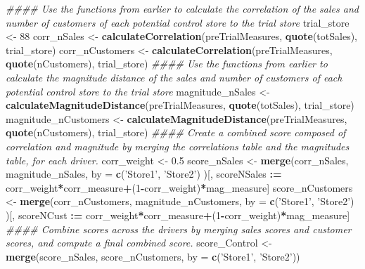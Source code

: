 \documentclass[]{article}
\newenvironment{Shaded}{\begin{snugshade}}{\end{snugshade}}
\newcommand{\CommentTok}[1]{\textcolor[rgb]{0.56,0.35,0.01}{\textit{#1}}}
\newcommand{\DataTypeTok}[1]{\textcolor[rgb]{0.13,0.29,0.53}{#1}}
\newcommand{\DecValTok}[1]{\textcolor[rgb]{0.00,0.00,0.81}{#1}}
\newcommand{\ErrorTok}[1]{\textcolor[rgb]{0.64,0.00,0.00}{\textbf{#1}}}
\newcommand{\FloatTok}[1]{\textcolor[rgb]{0.00,0.00,0.81}{#1}}
\newcommand{\KeywordTok}[1]{\textcolor[rgb]{0.13,0.29,0.53}{\textbf{#1}}}
\newcommand{\NormalTok}[1]{#1}
\newcommand{\OperatorTok}[1]{\textcolor[rgb]{0.81,0.36,0.00}{\textbf{#1}}}
\newcommand{\StringTok}[1]{\textcolor[rgb]{0.31,0.60,0.02}{#1}}
\begin{document}
\begin{Shaded}
\begin{Highlighting}[]
{\CommentTok{#### Use the functions from earlier to calculate the correlation of the sales and number of customers of each potential control store to the trial store}
\NormalTok{trial_store <-}\StringTok{ }\DecValTok{88}
\NormalTok{corr_nSales <-}\StringTok{ }\KeywordTok{calculateCorrelation}\NormalTok{(preTrialMeasures, }\KeywordTok{quote}\NormalTok{(totSales), trial_store)}
\NormalTok{corr_nCustomers <-}\StringTok{ }\KeywordTok{calculateCorrelation}\NormalTok{(preTrialMeasures, }\KeywordTok{quote}\NormalTok{(nCustomers), trial_store)}
\CommentTok{#### Use the functions from earlier to calculate the magnitude distance of the sales and number of customers of each potential control store to the trial store}
\NormalTok{magnitude_nSales <-}\StringTok{ }\KeywordTok{calculateMagnitudeDistance}\NormalTok{(preTrialMeasures, }\KeywordTok{quote}\NormalTok{(totSales), trial_store)}
\NormalTok{magnitude_nCustomers <-}\StringTok{ }\KeywordTok{calculateMagnitudeDistance}\NormalTok{(preTrialMeasures, }\KeywordTok{quote}\NormalTok{(nCustomers), trial_store)}
\CommentTok{#### Create a combined score composed of correlation and magnitude by merging the correlations table and the magnitudes table, for each driver.}
\NormalTok{corr_weight <-}\StringTok{ }\FloatTok{0.5}
\NormalTok{score_nSales <-}\StringTok{ }\KeywordTok{merge}\NormalTok{(corr_nSales, magnitude_nSales,}
                      \DataTypeTok{by =} \KeywordTok{c}\NormalTok{(}\StringTok{'Store1'}\NormalTok{, }\StringTok{'Store2'}\NormalTok{)}
\NormalTok{                      )[, scoreNSales }\OperatorTok{:}\ErrorTok{=}\StringTok{ }\NormalTok{corr_weight}\OperatorTok{*}\NormalTok{corr_measure}\OperatorTok{+}\NormalTok{(}\DecValTok{1}\OperatorTok{-}\NormalTok{corr_weight)}\OperatorTok{*}\NormalTok{mag_measure]}
\NormalTok{score_nCustomers <-}\StringTok{ }\KeywordTok{merge}\NormalTok{(corr_nCustomers, magnitude_nCustomers,}
                      \DataTypeTok{by =} \KeywordTok{c}\NormalTok{(}\StringTok{'Store1'}\NormalTok{, }\StringTok{'Store2'}\NormalTok{)}
\NormalTok{                      )[, scoreNCust }\OperatorTok{:}\ErrorTok{=}\StringTok{ }\NormalTok{corr_weight}\OperatorTok{*}\NormalTok{corr_measure}\OperatorTok{+}\NormalTok{(}\DecValTok{1}\OperatorTok{-}\NormalTok{corr_weight)}\OperatorTok{*}\NormalTok{mag_measure]}
\CommentTok{#### Combine scores across the drivers by merging sales scores and customer scores, and compute a final combined score.}
\NormalTok{score_Control <-}\StringTok{ }\KeywordTok{merge}\NormalTok{(score_nSales, score_nCustomers, }\DataTypeTok{by =} \KeywordTok{c}\NormalTok{(}\StringTok{'Store1'}\NormalTok{, }\StringTok{'Store2'}\NormalTok{))}
}
\end{Highlighting}
\end{Shaded}
\end{document}
